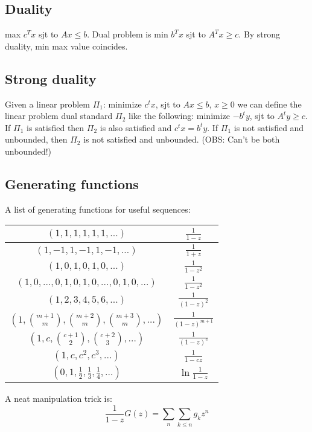 \subsection{Duality}
  max $c^Tx$ sjt to $Ax \leq b$. Dual problem is min $b^Tx$ sjt to $A^Tx \geq c$. By strong duality, min max value coincides.

  \subsection{Strong duality}
  Given a linear problem $\Pi_{1}$: minimize $c^t x$, sjt to $Ax \leq b$, $x \geq 0$ we can define the linear problem dual standard $\Pi_{2}$ like the following: minimize $-b^t y$, sjt to $A^t y \geq c$. If $\Pi_{1}$ is satisfied then $\Pi_{2}$ is also satisfied and $c^t x = b^t y$. If $\Pi_{1}$ is not satisfied and unbounded, then $\Pi_{2}$ is not satisfied and unbounded. (OBS: Can't be both unbounded!)

\subsection{Generating functions}
  A list of generating functions for useful sequences:


  \begin{tabular}{|c|c|}
    \hline
    $(1,1,1,1,1,1,\ldots)$ & $\frac{1}{1-z}$ \\ \hline
    $(1,-1,1,-1,1,-1,\ldots)$ & $\frac{1}{1+z}$ \\ \hline
    $(1,0,1,0,1,0,\ldots)$ & $\frac{1}{1-z^2}$ \\ \hline
    $(1,0,\ldots,0,1,0,1,0,\ldots,0,1,0,\ldots)$ & $\frac{1}{1-z^2}$ \\ \hline
    $(1,2,3,4,5,6,\ldots)$ & $\frac{1}{(1-z)^2}$ \\ \hline
    $(1,\binom{m+1}{m},\binom{m+2}{m},\binom{m+3}{m},\ldots)$ & $\frac{1}{(1-z)^{m+1}}$ \\ \hline
    $(1,c,\binom{c+1}{2},\binom{c+2}{3},\ldots)$ & $\frac{1}{(1-z)^c}$ \\ \hline
    $(1,c,c^2, c^3, \ldots)$ & $\frac{1}{1-cz}$ \\ \hline
    $(0,1,\frac{1}{2},\frac{1}{3},\frac{1}{4},\ldots)$ & $\ln \frac{1}{1-z}$ \\ \hline
  \end{tabular}


A neat manipulation trick is:
\begin{equation*}
  \frac{1}{1-z}G(z) = \sum_{n}\sum_{k\leq n}g_kz^n
\end{equation*}


